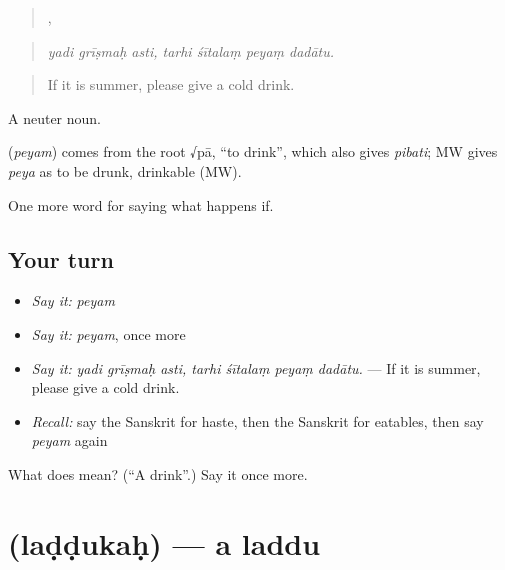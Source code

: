 \begin{quote}
  ,    
\end{quote}

\begin{quote}
\emph{yadi grīṣmaḥ asti, tarhi śītalaṃ peyaṃ dadātu.}
\end{quote}

\begin{quote}
If it is summer, please give a cold drink.
\end{quote}

A neuter noun.

\begin{cousinweb}
\textbf{} (\emph{peyam}) comes from the root √pā, \textquotedblleft{}to drink\textquotedblright{}, which also gives \emph{pibati}; MW gives \emph{peya} as to be drunk, drinkable (MW).
\end{cousinweb}

\begin{grammarlens}[title={What you've built}]
One more word for saying what happens if.
\end{grammarlens}

\subsection*{Your turn}
\begin{itemize}
\raggedright
  \item \emph{Say it:} \emph{peyam}
  \item \emph{Say it:} \emph{peyam}, once more
  \item \emph{Say it:} \emph{yadi grīṣmaḥ asti, tarhi śītalaṃ peyaṃ dadātu.} — If it is summer, please give a cold drink.
  \item \emph{Recall:} say the Sanskrit for haste, then the Sanskrit for eatables, then say \emph{peyam} again
\end{itemize}

\begin{tcolorbox}[breakable,colback=teal!4,colframe=teal!35!black,title={Before you move on}]
What does  mean? (\textquotedblleft{}A drink\textquotedblright{}.) Say it once more.
\end{tcolorbox}
\section[\texorpdfstring{\sk{लड्डुकः} (laḍḍukaḥ)}{लड्डुकः (laḍḍukaḥ)}]{ (laḍḍukaḥ) — a laddu}

